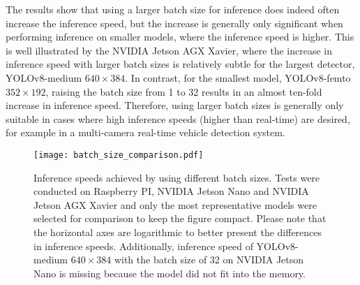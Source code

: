 The results show that using a larger batch size for inference does indeed often
increase the inference speed, but the increase is generally only significant
when performing inference on smaller models, where the inference speed is
higher. This is well illustrated by the NVIDIA Jetson AGX Xavier, where the
increase in inference speed with larger batch sizes is relatively subtle for the
largest detector, YOLOv8-medium $640 \times 384$. In contrast, for the smallest
model, YOLOv8-femto $352 \times 192$, raising the batch size from 1 to 32
results in an almost ten-fold increase in inference speed. Therefore, using
larger batch sizes is generally only suitable in cases where high inference
speeds (higher than real-time) are desired, for example in a multi-camera
real-time vehicle detection system.



\begin{figure}[t]
    \begin{framed}
        \centering
        \texttt{[image: batch\_size\_comparison.pdf]}
        \caption{Inference speeds achieved by using different batch sizes. Tests
        were conducted on Raspberry PI, NVIDIA Jetson Nano and NVIDIA Jetson AGX
        Xavier and only the most representative models were selected for
        comparison to keep the figure compact. Please note that the horizontal
        axes are logarithmic to better present the differences in inference
        speeds. Additionally, inference speed of YOLOv8-medium $640 \times 384$
        with the batch size of 32 on NVIDIA Jetson Nano is missing because the
        model did not fit into the memory.}
        \label{BatchSizeComparison}
    \end{framed}
\end{figure}






